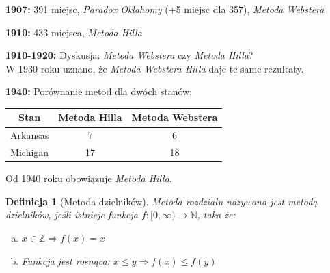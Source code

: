 \documentclass[12pt,a4paper]{article}
\theoremstyle{break}
\newtheorem{definition}{Definicja}[section]
\begin{document}
	\noindent \textbf{1907:} 391 miejsc, \textit{Paradox Oklahomy} (+5 miejsc dla 357), \textit{Metoda Webstera}
	
	\noindent \textbf{1910:} 433 miejsca, \textit{Metoda Hilla}
	
	\noindent \textbf{1910-1920:} Dyskusja: \textit{Metoda Webstera} czy \textit{Metoda Hilla}? \\
	W 1930 roku uznano, że \textit{Metoda Webstera-Hilla} daje te same rezultaty.
	
	\noindent \textbf{1940:} Porównanie metod dla dwóch stanów:
	
	\begin{center}
		\begin{tabular}{|c|c|c|}
			\hline
			Stan & Metoda Hilla & Metoda Webstera \\
			\hline
			Arkansas & 7 & 6 \\
			\hline
			Michigan & 17 & 18 \\
			\hline
		\end{tabular}
	\end{center}
	
	Od 1940 roku obowiązuje \textit{Metoda Hilla}.
	
	\begin{definition}[Metoda dzielników]
		Metoda rozdziału nazywana jest metodą dzielników, jeśli istnieje funkcja 
		$f: [0, \infty) \to \mathbb{N}$, taka że:
		\begin{enumerate}[a)]
			\item $x \in \mathbb{Z} \Rightarrow f(x) = x$
			\item Funkcja jest rosnąca: $x \leq y \Rightarrow f(x) \leq f(y)$
		\end{enumerate}
	\end{definition}
		
\end{document}
